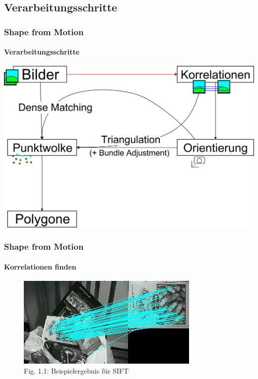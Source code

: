 \documentclass{beamer}
\begin{document}
\subsection{Verarbeitungsschritte}
\begin{frame}
	\frametitle{Shape from Motion}
	\framesubtitle{Verarbeitungsschritte}
	
	\includegraphics[width=\linewidth]{includes/shape-from-motion_process_1}
\end{frame}


\begin{frame}
	\frametitle{Shape from Motion}
	\framesubtitle{Korrelationen finden}

	\begin{figure}
		\includegraphics[width=\linewidth]{includes/sift}\\
		{\scriptsize Fig. 1.1: Beispielergebnis für SIFT}
	\end{figure}
\end{frame}
\end{document}
